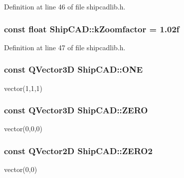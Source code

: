 Definition at line 46 of file shipcadlib.\-h.

\hypertarget{namespaceShipCAD_a80babe3fef93f1117e1c410f8d3c22c2}{
\subsubsection[{k\-Zoomfactor}]{\setlength{\rightskip}{0pt plus 5cm}const float Ship\-C\-A\-D\-::k\-Zoomfactor = 1.\-02f}}\label{namespaceShipCAD_a80babe3fef93f1117e1c410f8d3c22c2}


Definition at line 47 of file shipcadlib.\-h.

\hypertarget{namespaceShipCAD_ad454d484187a50b115d2e77055617816}{
\subsubsection[{O\-N\-E}]{\setlength{\rightskip}{0pt plus 5cm}const Q\-Vector3\-D Ship\-C\-A\-D\-::\-O\-N\-E}}\label{namespaceShipCAD_ad454d484187a50b115d2e77055617816}
vector(1,1,1) \hypertarget{namespaceShipCAD_a949bc53a1634b268b43de672807480fb}{
\subsubsection[{Z\-E\-R\-O}]{\setlength{\rightskip}{0pt plus 5cm}const Q\-Vector3\-D Ship\-C\-A\-D\-::\-Z\-E\-R\-O}}\label{namespaceShipCAD_a949bc53a1634b268b43de672807480fb}
vector(0,0,0) \hypertarget{namespaceShipCAD_ab47218dccdf4c94d5989b2e5b13d8603}{
\subsubsection[{Z\-E\-R\-O2}]{\setlength{\rightskip}{0pt plus 5cm}const Q\-Vector2\-D Ship\-C\-A\-D\-::\-Z\-E\-R\-O2}}\label{namespaceShipCAD_ab47218dccdf4c94d5989b2e5b13d8603}
vector(0,0) 